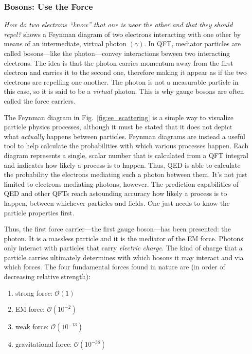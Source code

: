\subsubsection{Bosons: Use the Force}

\emph{How do two electrons ``know'' that one is near the other and that they should repel?}
 shows a Feynman diagram of two electrons interacting with one other by means of an intermediate, virtual photon $(\gamma)$.
In QFT, mediator particles are called bosons---like the photon---convey interactions beween two interacting electrons.
The idea is that the photon carries momentum away from the first electron and carries it to the second one, therefore making it appear as if the two electrons are repelling one another.
The photon is not a measurable particle in this case, so it is said to be a \emph{virtual} photon.
This is why gauge bosons are often called the force carriers.

The Feynman diagram in Fig.~\ref{fig:ee_scattering} is a simple way to visualize particle physics processes, although it must be stated that it does not depict what \emph{actually} happens between particles.
Feynman diagrams are instead a useful tool to help calculate the probabilities with which various processes happen.
Each diagram represents a single, scalar number that is calculated from a QFT integral and indicates how likely a process is to happen.
Thus, QED is able to calculate the probability the electrons mediating such a photon between them. 
It's not just limited to electrons mediating photons, however.
The prediction capabilities of QED and other QFTs reach astounding accuracy how likely a process is to happen, between whichever particles and fields. 
One just needs to know the particle properties first.

Thus, the first force carrier---the first gauge boson---has been presented: the photon.
It is a massless particle and it is the mediator of the EM force. 
Photons only interact with particles that carry \emph{electric charge}.
The kind of charge that a particle carries ultimately determines with which bosons it may interact and via which forces.
The four fundamental forces found in nature are (in order of decreasing relative strength):
\begin{enumerate}
    \item strong force: $\mathcal{O}(1)$
    \item EM force: $\mathcal{O}(10^{-2})$
    \item weak force: $\mathcal{O}(10^{-13})$
    \item gravitational force: $\mathcal{O}(10^{-38})$
\end{enumerate}

